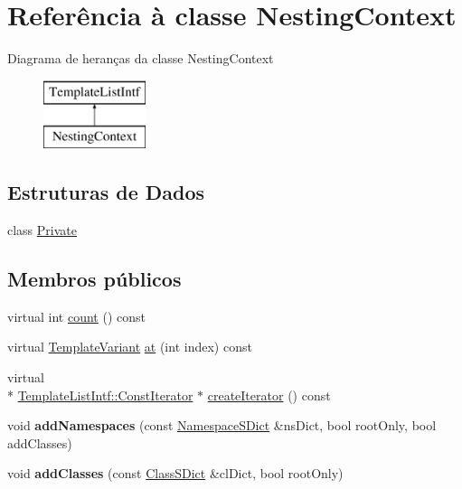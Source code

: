 \hypertarget{class_nesting_context}{\section{Referência à classe Nesting\-Context}
\label{class_nesting_context}
}
Diagrama de heranças da classe Nesting\-Context\begin{figure}[H]
\begin{center}
\leavevmode
\includegraphics[height=2.000000cm]{class_nesting_context}
\end{center}
\end{figure}
\subsection*{Estruturas de Dados}
\begin{DoxyCompactItemize}
\item 
class \hyperlink{class_nesting_context_1_1_private}{Private}
\end{DoxyCompactItemize}
\subsection*{Membros públicos}
\begin{DoxyCompactItemize}
\item 
virtual int \hyperlink{class_nesting_context_a0745638c9967e2ed90bc96c012288c55}{count} () const 
\item 
virtual \hyperlink{class_template_variant}{Template\-Variant} \hyperlink{class_nesting_context_a55f90d50fcb1378b2a97b9c3ad5bb162}{at} (int index) const 
\item 
virtual \\*
\hyperlink{class_template_list_intf_1_1_const_iterator}{Template\-List\-Intf\-::\-Const\-Iterator} $\ast$ \hyperlink{class_nesting_context_a0b1d6dedc3f51750e5cba18f51022f10}{create\-Iterator} () const 
\item 
\hypertarget{class_nesting_context_af079a2e7358b50382a0035949511374f}{void {\bfseries add\-Namespaces} (const \hyperlink{class_namespace_s_dict}{Namespace\-S\-Dict} \&ns\-Dict, bool root\-Only, bool add\-Classes)}\label{class_nesting_context_af079a2e7358b50382a0035949511374f}

\item 
\hypertarget{class_nesting_context_a817b872b1eaea343ea0e3002964eb73b}{void {\bfseries add\-Classes} (const \hyperlink{class_class_s_dict}{Class\-S\-Dict} \&cl\-Dict, bool root\-Only)}\label{class_nesting_context_a817b872b1eaea343ea0e3002964eb73b}

\end{DoxyCompactItemize}


